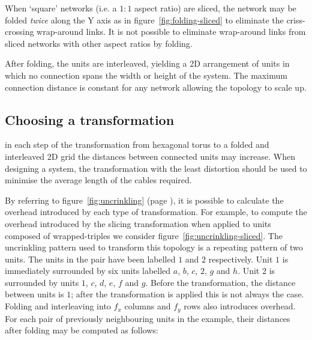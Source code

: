 			When `square' networks (i.e. a $1:1$ aspect ratio) are sliced, the
			network may be folded \emph{twice} along the Y axis as in
			figure~\ref{fig:folding-sliced} to eliminate the criss-crossing
			wrap-around links. It is not possible to eliminate wrap-around links from
			sliced networks with other aspect ratios by folding.
			
			After folding, the units are interleaved, yielding a 2D arrangement of
			units in which no connection spans the width or height of the system. The
			maximum connection distance is constant for any network allowing the
			topology to scale up.
		
		\subsection{Choosing a transformation}
			
			\label{sec:distortion}
			
			in each step of the transformation from hexagonal torus to a folded and
			interleaved 2D grid the distances between connected units may increase.
			When designing a system, the transformation with the least distortion
			should be used to minimise the average length of the cables required.
			
			By referring to figure~\ref{fig:uncrinkling} (page
			\pageref{fig:uncrinkling}), it is possible to calculate the overhead
			introduced by each type of transformation.  For example, to compute the
			overhead introduced by the slicing transformation when applied to units
			composed of wrapped-triples we consider
			figure~\ref{fig:uncrinkling-sliced}. The uncrinkling pattern used to
			transform this topology is a repeating pattern of two units. The units in
			the pair have been labelled $1$ and $2$ respectively. Unit $1$ is
			immediately surrounded by six units labelled $a$, $b$, $c$, $2$, $g$ and
			$h$. Unit $2$ is surrounded by units $1$, $c$, $d$, $e$, $f$ and $g$.
			Before the transformation, the distance between units is $1$; after the
			transformation is applied this is not always the case. Folding and
			interleaving into $f_x$ columns and $f_y$ rows also introduces overhead.
			For each pair of previously neighbouring units in the example, their
			distances after folding may be computed as follows:
			
